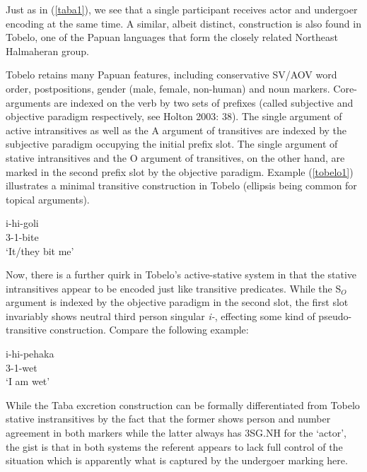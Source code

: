 Just as in (\ref{taba1}), we see that a single participant receives actor and undergoer encoding at the same time. A similar, albeit distinct, construction is also found in Tobelo, one of the Papuan languages that form the closely related Northeast Halmaheran group. 

Tobelo retains many Papuan features, including conservative SV/AOV word order, postpositions, gender (male, female, non-human) and noun markers. Core-arguments are indexed on the verb by two sets of prefixes (called subjective and objective paradigm respectively, see Holton 2003: 38). The single argument of active intransitives as well as the A argument of transitives are indexed by the subjective paradigm occupying the initial prefix slot. The single argument of stative intransitives and the O argument of transitives, on the other hand, are marked in the second prefix slot by the objective paradigm. Example (\ref{tobelo1}) illustrates a minimal transitive construction in Tobelo (ellipsis being common for topical arguments).

\ea \label{tobelo1}
\gll i-hi-goli \\
3-1-bite \\
\glft `It/they bit me' \\ 
\z
\xe

Now, there is a further quirk in Tobelo's active-stative system in that the stative intransitives appear to be encoded just like transitive predicates. While the S$_O$ argument is indexed by the objective paradigm in the second slot, the first slot invariably shows neutral third person singular \textit{i-}, effecting some kind of pseudo-transitive construction. Compare the following example:

\ea 
\gll i-hi-pehaka \\
3-1-wet \\
\glft `I am wet' \\ 
\z
\xe

While the Taba excretion construction can be formally differentiated from Tobelo stative instransitives by the fact that the former shows person and number agreement in both markers while the latter always has 3SG.NH for the `actor', the gist is that in both systems the referent appears to lack full control of the situation which is apparently what is captured by the undergoer marking here.

